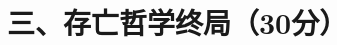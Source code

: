 \documentclass[class=exam-zh, crop]{standalone}
\begin{document}
\section{三、存亡哲学终局（30分）}
\end{document}
